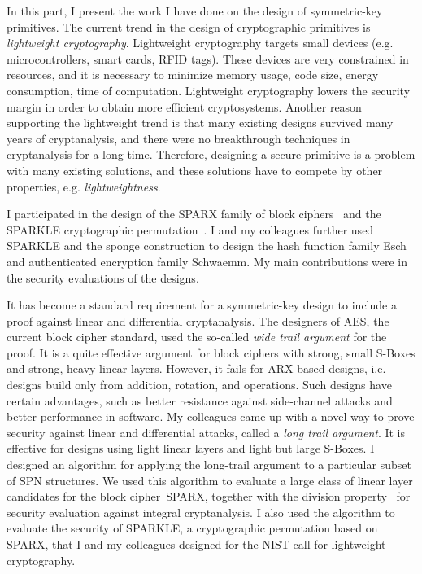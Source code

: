In this part, I present the work I have done on the design of symmetric-key primitives. The current trend in the design of cryptographic primitives is \emph{lightweight cryptography}. Lightweight cryptography targets small devices (e.g. microcontrollers, smart cards, RFID tags). These devices are very constrained in resources, and it is necessary to minimize memory usage, code size, energy consumption, time of computation. Lightweight cryptography lowers the security margin in order to obtain more efficient cryptosystems. Another reason supporting the lightweight trend is that many existing designs survived many years of cryptanalysis, and there were no breakthrough techniques in cryptanalysis for a long time. Therefore, designing a secure primitive is a problem with many existing solutions, and these solutions have to compete by other properties, e.g. \emph{lightweightness}.

\newcommand{\sparx}{\textsf{SPARX}}
\newcommand{\sparkle}{\textsf{SPARKLE}}
\newcommand{\esch}{\textsf{Esch}}
\newcommand{\schwaemm}{\textsf{Schwaemm}}
I participated in the design of the \sparx{} family of block ciphers~\cite{OurSPARX} and the \sparkle{} cryptographic permutation~\cite{OurSPARKLE}. I and my colleagues further used \sparkle{} and the sponge construction to design the hash function family \esch{} and authenticated encryption family \schwaemm{}. My main contributions were in the security evaluations of the designs. 

It has become a standard requirement for a symmetric-key design to include a proof against linear and differential cryptanalysis. The designers of AES, the current block cipher standard, used the so-called \emph{wide trail argument} for the proof. It is a quite effective argument for block ciphers with strong, small S-Boxes and strong, heavy linear layers. However, it fails for ARX-based designs, i.e. designs build only from addition, rotation, and \txor operations. Such designs have certain advantages, such as better resistance against side-channel attacks and better performance in software. My colleagues came up with a novel way to prove security against linear and differential attacks, called a \emph{long trail argument}. It is effective for designs using light linear layers and light but large S-Boxes. I designed an algorithm for applying the long-trail argument to a particular subset of SPN structures. We used this algorithm to evaluate a large class of linear layer candidates for the block cipher~\sparx{}, together with the division property~\cite{division} for security evaluation against integral cryptanalysis. I also used the algorithm to evaluate the security of \sparkle{}, a cryptographic permutation based on \sparx{}, that I and my colleagues designed for the NIST call for lightweight cryptography.